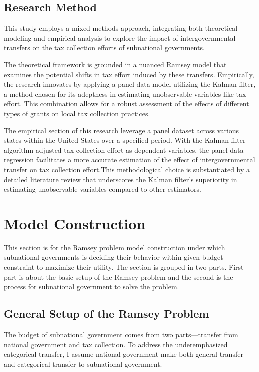 \subsection{Research Method}
This study employs a mixed-methods approach, integrating both theoretical modeling and empirical analysis to explore the impact of intergovernmental transfers on the tax collection efforts of subnational governments.

The theoretical framework is grounded in a nuanced Ramsey model that examines the potential shifts in tax effort induced by these transfers. Empirically, the research innovates by applying a panel data model utilizing the Kalman filter, a method chosen for its adeptness in estimating unobservable variables like tax effort. This combination allows for a robust assessment of the effects of different types of grants on local tax collection practices.

The empirical section of this research leverage a panel dataset across various states within the United States over a specified period. With the Kalman filter algorithm adjusted tax collection effort as dependent variables, the panel data regression facilitates a more accurate estimation of the effect of intergovernmental transfer on tax collection effort.This methodological choice is substantiated by a detailed literature review that underscores the Kalman filter's superiority in estimating unobservable variables compared to other estimators.

\section{Model Construction}
This section is for the Ramsey problem model construction under which subnational governments is deciding their behavior within given budget constraint to maximize their utility. The section is grouped in two parts. First part is about the basic setup of the Ramsey problem and the second is the process for subnational government to solve the problem.

\subsection{General Setup of the Ramsey Problem}

The budget of subnational government comes from two parts---transfer from national government and tax collection. To address the underemphasized categorical transfer, I assume national government make both general transfer and categorical transfer to subnational government.

